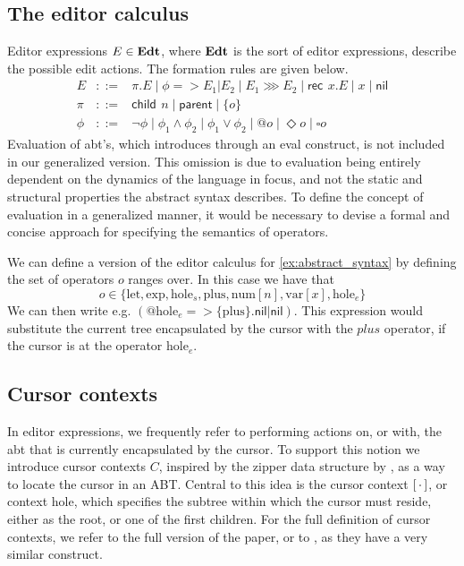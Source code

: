 \documentclass[sigplan,review]{acmart}
\newcommand{\abt}{\textsf{abt}\xspace}
\newcommand{\ec}[1]{\ensuremath{\textsf{#1}}\xspace}
\newcommand{\rec}{\ec{rec}\,}
\newcommand{\chld}{\ec{child}\,}
\newcommand{\parnt}{\ec{parent}}
\newcommand{\nil}{\ec{nil}}
\begin{document}
\subsection{The editor calculus}
Editor expressions $E \in \textbf{Edt}$, where $\textbf{Edt}$ is the sort of editor
expressions, describe the possible edit actions. The formation rules
are given below.
%
\begin{align*}
  E & ::= & \pi.E  \mid  \phi => E_1|E_2  \mid  E_1 \ggg E_2  \mid  \rec  \ x.E  \mid  x  \mid  \nil  \\
    \pi & ::= & \chld  \ n  \mid  \parnt   \mid  \{o\} \\
    \phi & ::= & \neg\phi  \mid  \phi_1 \wedge \phi_2  \mid  \phi_1 \vee \phi_2  \mid  @o  \mid  \Diamond o  \mid  \square o
\end{align*}
%
Evaluation of {\abt}'s, which \cite{type_safe_structure_editor}
introduces through an \textsf{eval} construct, is not included in our
generalized version. This omission is due to evaluation being entirely
dependent on the dynamics of the language in focus, and not the static
and structural properties the abstract syntax describes. To define the
concept of evaluation in a generalized manner, it would be necessary
to devise a formal and concise approach for specifying the semantics
of operators.

\begin{example}\label{ex:editor_calculus}
    We can define a version of the editor calculus for
    \cref{ex:abstract_syntax} by defining the set of operators $o$ ranges over. In this case we have that
    \begin{equation*}
        o \in \{ \text{let}, \text{exp}, \text{hole}_s, \text{plus}, \text{num}[n], \text{var}[x], \text{hole}_e \}
    \end{equation*}
    We can then write e.g. $(@\text{hole}_e =>
    \{\text{plus}\}.\nil |\nil )$. This expression would
    substitute the current tree encapsulated by the cursor with the
    $plus$ operator, if the cursor is at the operator
    $\text{hole}_e$. 
\end{example}

\subsection{Cursor contexts}

In editor expressions, we frequently refer to performing actions on,
or with, the \abt that is currently encapsulated by the cursor. To
support this notion we introduce cursor contexts $C$, inspired by the
zipper data structure by \cite{huet_zipper}, as a way to locate the
cursor in an ABT. Central to this idea is the cursor context
$[ \, \cdot \, ]$, or context hole, which specifies the subtree within which
the cursor must reside, either as the root, or one of the first
children.  For the full definition of cursor contexts, we refer to the
full version of the paper, or to \cite{type_safe_structure_editor}, as
they have a very similar construct. 
\end{document}
